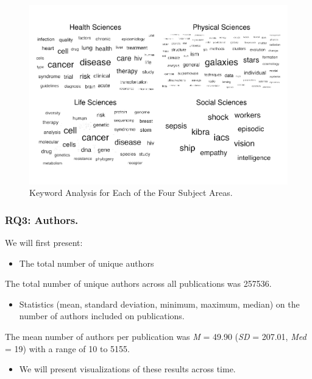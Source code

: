 \documentclass[
  man]{apa7}
\providecommand{\tightlist}{%
  \setlength{\itemsep}{0pt}\setlength{\parskip}{0pt}}
\begin{document}
\begin{figure}
\centering
\includegraphics{manuscript_scopus_files/figure-latex/fig-keywords-1.pdf}
\caption{\label{fig:fig-keywords}Keyword Analysis for Each of the Four Subject Areas.}
\end{figure}

\hypertarget{rq3-authors.}{%
\subsubsection{RQ3: Authors.}\label{rq3-authors.}}

We will first present:

\begin{itemize}
\tightlist
\item
  The total number of unique authors
\end{itemize}

The total number of unique authors across all publications was
257536.

\begin{itemize}
\tightlist
\item
  Statistics (mean, standard deviation, minimum, maximum, median) on
  the number of authors included on publications.
\end{itemize}

The mean number of authors per publication was \emph{M} = 49.90
(\emph{SD} = 207.01, \emph{Med} = 19) with a range of
10 to 5155.

\begin{itemize}
\tightlist
\item
  We will present visualizations of these results across time.
\end{itemize}
\end{document}

